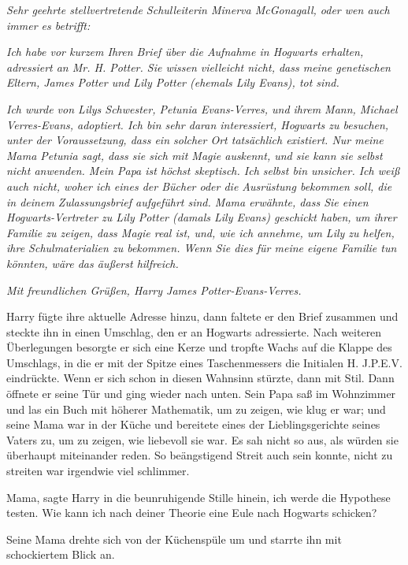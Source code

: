 \emph{Sehr geehrte stellvertretende Schulleiterin Minerva McGonagall, oder wen
auch immer es betrifft:}

\emph{Ich habe vor kurzem Ihren Brief über die Aufnahme in Hogwarts erhalten,
adressiert an Mr. H. Potter. Sie wissen vielleicht nicht, dass meine genetischen
Eltern, James Potter und Lily Potter (ehemals Lily Evans), tot sind.}

\emph{Ich wurde von Lilys Schwester, Petunia Evans-Verres, und ihrem Mann,
Michael Verres-Evans, adoptiert. Ich bin sehr daran interessiert, Hogwarts zu
besuchen, unter der Voraussetzung, dass ein solcher Ort tatsächlich existiert.
Nur meine Mama Petunia sagt, dass sie sich mit Magie auskennt, und sie kann
sie selbst nicht anwenden. Mein Papa ist höchst skeptisch. Ich selbst bin
unsicher. Ich weiß auch nicht, woher ich eines der Bücher oder die Ausrüstung
bekommen soll, die in deinem Zulassungsbrief aufgeführt sind. Mama erwähnte,
dass Sie einen Hogwarts-Vertreter zu Lily Potter (damals Lily Evans) geschickt
haben, um ihrer Familie zu zeigen, dass Magie real ist, und, wie ich annehme, um
Lily zu helfen, ihre Schulmaterialien zu bekommen. Wenn Sie dies für meine
eigene Familie tun könnten, wäre das äußerst hilfreich.}

\emph{Mit freundlichen Grüßen, Harry James Potter-Evans-Verres.}

Harry fügte ihre aktuelle Adresse hinzu, dann faltete er den Brief zusammen und
steckte ihn in einen Umschlag, den er an Hogwarts adressierte. Nach weiteren
Überlegungen besorgte er sich eine Kerze und tropfte Wachs auf die Klappe des
Umschlags, in die er mit der Spitze eines Taschenmessers die Initialen H.
J.P.E.V. eindrückte. Wenn er sich schon in diesen Wahnsinn stürzte, dann mit
Stil. Dann öffnete er seine Tür und ging wieder nach unten. Sein Papa saß im
Wohnzimmer und las ein Buch mit höherer Mathematik, um zu zeigen, wie klug er
war; und seine Mama war in der Küche und bereitete eines der Lieblingsgerichte
seines Vaters zu, um zu zeigen, wie liebevoll sie war. Es sah nicht so aus, als
würden sie überhaupt miteinander reden. So beängstigend Streit auch sein konnte,
nicht zu streiten war irgendwie viel schlimmer.

\glqq{}Mama\grqq{}, sagte Harry in die beunruhigende Stille hinein, \glqq{}ich
werde die Hypothese testen. Wie kann ich nach deiner Theorie eine Eule nach
Hogwarts schicken?\grqq{}

Seine Mama drehte sich von der Küchenspüle um und starrte ihn mit schockiertem
Blick an.

